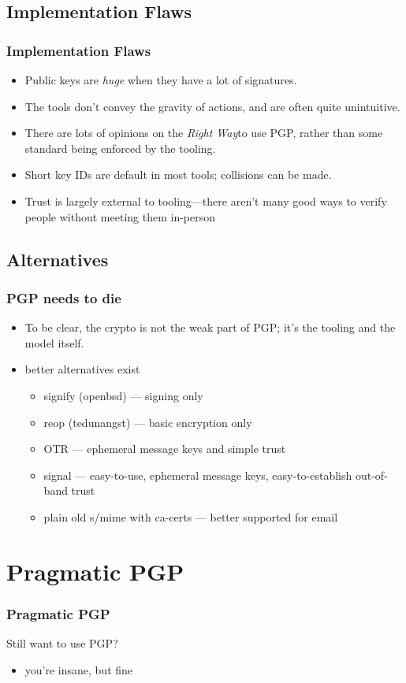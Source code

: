 \documentclass[aspectratio=1610,bigger,utf8]{beamer}
\begin{document}
\subsection{Implementation Flaws}
\begin{frame}
	\frametitle{Implementation Flaws}
	\begin{itemize}
		\item Public keys are \emph{huge} when they have a lot of
			signatures.
		\item The tools don't convey the gravity of actions, and are
			often quite unintuitive.
		\item There are lots of opinions on the \emph{Right
			Way}\texttrademark to use PGP, rather than some
			standard being enforced by the tooling.
		\item Short key IDs are default in most tools; collisions can
			be made.
		\item Trust is largely external to tooling---there aren't many
			good ways to verify people without meeting them
			in-person
	\end{itemize}
\end{frame}
\subsection{Alternatives}
\begin{frame}
	\frametitle{PGP needs to die}
	\begin{itemize}
		\item To be clear, the \alert{crypto} is not the weak part of
			PGP; it's the tooling and the model itself.
		\item better alternatives exist\pause
			\begin{itemize}
				\item signify (openbsd) --- signing only
				\item reop (tedunangst) --- basic encryption only
				\item OTR --- ephemeral message keys and simple trust
				\item signal --- easy-to-use, ephemeral message
					keys, easy-to-establish out-of-band
					trust
				\item plain old s/mime with ca-certs --- better
					supported for email
			\end{itemize}
	\end{itemize}
\end{frame}

\section{Pragmatic PGP}
\begin{frame}
	\frametitle{Pragmatic PGP}
	Still want to use PGP? 
	\begin{itemize}
		\item you're insane, but fine
	\end{itemize}
\end{frame}
\end{document}

